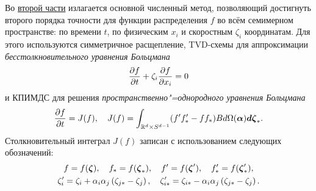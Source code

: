 Во \underline{второй части} излагается основной численный метод,
позволяющий достигнуть второго порядка точности для функции распределения \(f\) во всём семимерном пространстве:
по времени \(t\), по физическим \(x_i\) и скоростным \(\zeta_i\) координатам.
Для этого используются симметричное расщепление, TVD-схемы для аппроксимации
\emph{бесстолкновительного уравнения Больцмана}
\begin{equation*}
    \pder[f]{t} + \zeta_i\pder[f]{x_i} = 0
\end{equation*}
и КПИМДС для решения \emph{пространственно"=однородного уравнения Больцмана}
\begin{equation*}
    \pder[f]{t} = J(f), \quad J(f) = \int_{\mathbb{R}^d\times S^{d-1}} (f'f'_* - ff_*)B \dd\Omega(\boldsymbol{\alpha})\dzeta_*.
\end{equation*}
Столкновительный интеграл \(J(f)\) записан с использованием следующих обозначений:
\begin{gather*}
    f=f(\bzeta), \quad f_*=f(\bzeta_*), \quad f'=f(\bzeta'), \quad f'_*=f(\bzeta'_*), \\
    \zeta_i' = \zeta_i+\alpha_i\alpha_j \left(\zeta_{j*}-\zeta_j\right), \quad
    \zeta_{i*}' = \zeta_{i*}-\alpha_i\alpha_j \left(\zeta_{j*}-\zeta_j\right).
\end{gather*}

